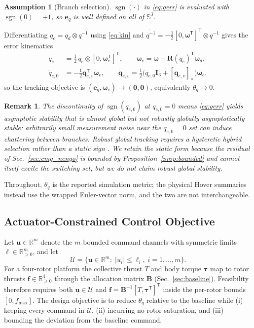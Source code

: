 \documentclass[letterpaper,10pt,conference]{IEEEtran}
\newcommand{\R}{\mathbb{R}}
\newcommand{\T}{^{\mathsf T}}
\newcommand{\sgn}{\operatorname{sgn}}
\newtheorem{assumption}{Assumption}
\newtheorem{remark}{Remark}
\begin{document}
\begin{assumption}[Branch selection]
\label{ass:branch}
$\sgn(\cdot)$ in \eqref{eq:qerr} is evaluated with $\sgn(0)=+1$, so
$\bm e_q$ is well defined on all of $\mathbb{S}^3$.
\end{assumption}

Differentiating $q_e=q_d\otimes q^{-1}$ using \eqref{eq:kin} and
$\dot{q^{-1}}=-\tfrac12[0,\bm\omega\T]\T\otimes q^{-1}$ gives the error
kinematics
\begin{align}
    \dot q_e&=\tfrac{1}{2}\,q_e\otimes[0,\bm\omega_e\T]\T,
    \qquad
    \bm\omega_e=\bm\omega-\bm R(q_e)\T\bm\omega_d ,
    \label{eq:errkin}\\
    \dot q_{e,0}&=-\tfrac12\bm q_{e,v}\T\bm\omega_e,
    \qquad
    \dot{\bm q}_{e,v}=\tfrac12\big(q_{e,0}\bm I_3
        +[\bm q_{e,v}]_\times\big)\bm\omega_e ,
    \label{eq:errkin_split}
\end{align}
so the tracking objective is $(\bm e_q,\bm\omega_e)\to(\bm 0,\bm 0)$,
equivalently $\theta_q\to0$.

\begin{remark}
The discontinuity of $\sgn(q_{e,0})$ at $q_{e,0}=0$ means
\eqref{eq:qerr} yields asymptotic stability that is \emph{almost} global
but not robustly globally asymptotically stable: arbitrarily small
measurement noise near the $q_{e,0}=0$ set can induce chattering between
branches. Robust global tracking requires a hysteretic hybrid selection
rather than a static sign \cite{mayhew2011hybrid,mayhew2013unwinding}. We
retain the static form because the residual of Sec.~\ref{sec:cmg_nengo} is
bounded by Proposition~\ref{prop:bounded} and cannot itself excite the
switching set, but we do not claim robust global stability.
\end{remark}

Throughout, $\theta_q$ is the reported simulation metric; the physical
Hover summaries instead use the wrapped Euler-vector norm, and the two are
not interchangeable.

\subsection{Actuator-Constrained Control Objective}

Let $\bm u\in\R^m$ denote the $m$ bounded command channels with symmetric
limits $\bm\ell\in\R^m_{>0}$, and let
\begin{equation}
    \mathcal{U}=\{\bm u\in\R^m:\;|u_i|\le\ell_i,\;i=1,\dots,m\}.
    \label{eq:Uset}
\end{equation}
For a four-rotor platform the collective thrust $T$ and body torque
$\bm\tau$ map to rotor thrusts $\bm f\in\R^4_{\ge0}$ through the allocation
matrix $\bm B$ (Sec.~\ref{sec:baseline}). Feasibility therefore requires
both $\bm u\in\mathcal{U}$ and $\bm f=\bm B^{-1}[T,\bm\tau\T]\T$ inside the
per-rotor bounds $[0,f_{\max}]$. The design objective is to reduce
$\theta_q$ relative to the baseline while (i) keeping every command in
$\mathcal{U}$, (ii) incurring no rotor saturation, and (iii) bounding the
deviation from the baseline command.
\end{document}
